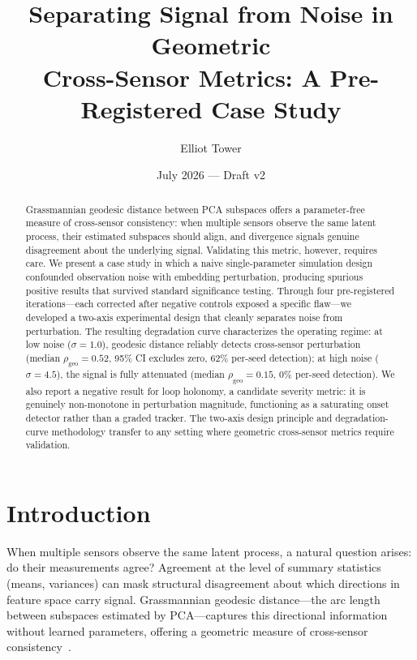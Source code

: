 \documentclass[11pt]{article}
\title{Separating Signal from Noise in Geometric\\
  Cross-Sensor Metrics: A Pre-Registered Case Study}
\author{Elliot Tower}
\date{July 2026 --- Draft v2}
\newcommand{\rhogeo}{\rho_\mathrm{geo}}
\begin{document}
\maketitle

\begin{abstract}
Grassmannian geodesic distance between PCA subspaces offers a
parameter-free measure of cross-sensor consistency: when multiple
sensors observe the same latent process, their estimated subspaces
should align, and divergence signals genuine disagreement about the
underlying signal.  Validating this metric, however, requires care.
We present a case study in which a naive single-parameter simulation
design confounded observation noise with embedding perturbation,
producing spurious positive results that survived standard
significance testing.  Through four pre-registered iterations---each
corrected after negative controls exposed a specific flaw---we
developed a two-axis experimental design that cleanly separates
noise from perturbation.  The resulting degradation curve
characterizes the operating regime: at low noise
($\sigma = 1.0$), geodesic distance reliably detects cross-sensor
perturbation (median $\rhogeo = 0.52$, 95\% CI excludes zero,
62\% per-seed detection); at high noise ($\sigma = 4.5$), the
signal is fully attenuated (median $\rhogeo = 0.15$, 0\%
per-seed detection).  We also report a negative result for loop
holonomy, a candidate severity metric: it is genuinely
non-monotone in perturbation magnitude, functioning as a
saturating onset detector rather than a graded tracker.  The
two-axis design principle and degradation-curve methodology
transfer to any setting where geometric cross-sensor metrics
require validation.
\end{abstract}

\section{Introduction}
\label{sec:intro}

When multiple sensors observe the same latent process, a natural
question arises: do their measurements agree?  Agreement at the
level of summary statistics (means, variances) can mask structural
disagreement about which directions in feature space carry signal.
Grassmannian geodesic distance---the arc length between subspaces
estimated by PCA---captures this directional information without
learned parameters, offering a geometric measure of cross-sensor
consistency~\citep{edelman1998geometry, chikuse2003statistics}.
\end{document}
